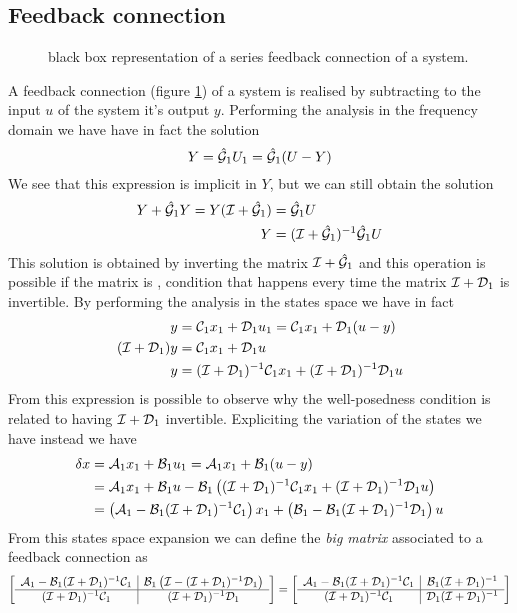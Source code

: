 	\subsection*{Feedback connection}	
		\begin{figure}[bt]
			\centering
			\caption{black box representation of a series feedback connection of a system.} \label{fig:dyn:feedback}
		\end{figure}
		
		A feedback connection (figure \ref{fig:dyn:feedback}) of a system is realised by subtracting to the input $u$ of the system it's output $y$. Performing the analysis in the frequency domain we have have in fact the solution
		\[ Y = \hat{\mathcal{G}}_1 U_1 = \hat{\mathcal{G}}_1 (U-Y) \]
		We see that this expression is implicit in $Y$, but we can still obtain the solution
		\begin{equation}
		\begin{split}
			Y + \hat{\mathcal{G}}_1 Y = Y(\mathcal{I} + \hat {\mathcal{G}}_1)& =\hat{\mathcal{G}}_1 U \\
			Y &= (\mathcal{I} + \hat {\mathcal{G}}_1)^{-1} \hat {\mathcal{G}}_1 U
		\end{split}
		\end{equation}
		This solution is obtained by inverting the matrix $\mathcal{I} + \hat {\mathcal{G}}_1$ and this operation is possible if the matrix is \textit{}, condition that happens every time the matrix $\mathcal{I} + \mathcal{D}_1$ is invertible. By performing the analysis in the states space we have in fact 
		\begin{align*}
			y & = \mathcal{C}_1 x_1 + \mathcal{D}_1 u_1 = \mathcal{C}_1 x_1 + \mathcal{D}_1 (u-y) \\
			(\mathcal{I} + \mathcal{D}_1) y & = \mathcal{C}_1 x_1 + \mathcal{D}_1 u \\
			y & = (\mathcal{I} + \mathcal{D}_1)^{-1}\mathcal{C}_1 x_1 +(\mathcal{I} + \mathcal{D}_1)^{-1} \mathcal{D}_1 u
		\end{align*}
		From this expression is possible to observe why the well-posedness condition is related to having $\mathcal{I} + \mathcal{D}_1$ invertible. Expliciting the variation of the states we have instead we have
		\begin{align*}
			\delta x & = \mathcal{A}_1 x_1 + \mathcal{B}_1 u_1 = \mathcal{A}_1x_1 + \mathcal{B}_1 (u-y) \\
			& = \mathcal{A}_1 x_1 + \mathcal{B}_1 u - \mathcal{B}_1 \left( (\mathcal{I} + \mathcal{D}_1)^{-1}\mathcal{C}_1 x_1 +(\mathcal{I} + \mathcal{D}_1)^{-1} \mathcal{D}_1 u \right) \\
			& = \left( \mathcal{A}_1 - \mathcal{B}_1 (\mathcal{I}+\mathcal{D}_1)^{-1} \mathcal{C}_1 \right) x_1 + \left( \mathcal{B}_1 - \mathcal{B}_1 (\mathcal{I}+\mathcal{D}_1)^{-1} \mathcal{D}_1 \right)u
		\end{align*}
		From this states space expansion we can define the \textit{big matrix} associated to a feedback connection as
		\begin{equation}
			\begin{bmatrix}  \begin{array} {c | c}
				\mathcal{A}_1 - \mathcal{B}_1(\mathcal{I}+\mathcal{D}_1)^{-1} \mathcal{C}_1 & \mathcal{B}_1\left(\mathcal{I} - (\mathcal{I}+\mathcal{D}_1)^{-1} \mathcal{D}_1\right) \\ \hline 
				(\mathcal{I}+\mathcal{D}_1)^{-1}\mathcal{C}_1 & (\mathcal{I}+\mathcal{D}_1)^{-1} \mathcal{D}_1
			\end{array}  \end{bmatrix} = 
			\begin{bmatrix}  \begin{array} {c | c}
				\mathcal{A}_1 - \mathcal{B}_1(\mathcal{I}+\mathcal{D}_1)^{-1} \mathcal{C}_1 & \mathcal{B}_1 (\mathcal{I}+\mathcal{D}_1)^{-1} \\ \hline 
				(\mathcal{I}+\mathcal{D}_1)^{-1}\mathcal{C}_1 & \mathcal{D}_1 (\mathcal{I}+\mathcal{D}_1)^{-1} 
		\end{array}  \end{bmatrix}
		\end{equation}
	
